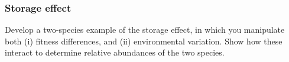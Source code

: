 \subsubsection*{Storage effect}
\begin{prob}
  Develop a two-species example of the storage effect, in which you manipulate both (i) fitness differences, and (ii) environmental variation. Show how these interact to determine relative abundances of the two species.
\end{prob}
